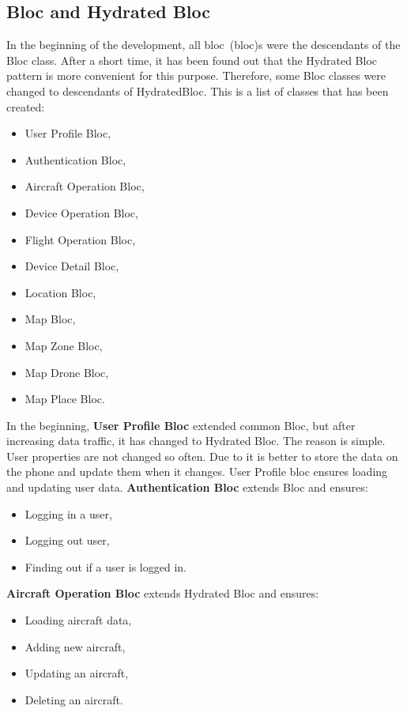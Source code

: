 \subsection{Bloc and Hydrated Bloc}\label{subsec:bloc-and-hydrated-bloc}
In the beginning of the development, all \acrshort{bloc}~(\acrlong{bloc})s were the descendants of the Bloc class.
After a short time, it has been found out that the Hydrated Bloc pattern is more convenient for this purpose.
Therefore, some Bloc classes were changed to descendants of HydratedBloc.
This is a list of classes that has been created:
\begin{itemize}
    \item User Profile Bloc,
    \item Authentication Bloc,
    \item Aircraft Operation Bloc,
    \item Device Operation Bloc,
    \item Flight Operation Bloc,
    \item Device Detail Bloc,
    \item Location Bloc,
    \item Map Bloc,
    \item Map Zone Bloc,
    \item Map Drone Bloc,
    \item Map Place Bloc.
\end{itemize}
In the beginning, \textbf{User Profile Bloc} extended common Bloc, but after increasing data traffic, it has changed to Hydrated Bloc.
The reason is simple.
User properties are not changed so often.
Due to it is better to store the data on the phone and update them when it changes.
User Profile bloc ensures loading and updating user data.
\newline
\textbf{Authentication Bloc} extends Bloc and ensures:
\begin{itemize}
    \item Logging in a user,
    \item Logging out user,
    \item Finding out if a user is logged in.
\end{itemize}
\textbf{Aircraft Operation Bloc} extends Hydrated Bloc and ensures:
\begin{itemize}
    \item Loading aircraft data,
    \item Adding new aircraft,
    \item Updating an aircraft,
    \item Deleting an aircraft.
\end{itemize}
